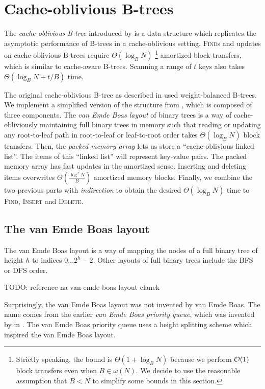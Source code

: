 \chapter{Cache-oblivious B-trees}
\label{chapter:cob}
The \emph{cache-oblivious B-tree} introduced by \cite{cobt}
is a data structure which replicates the asymptotic performance of B-trees
in a cache-oblivious setting.
\textsc{Find}s and updates on cache-oblivious B-trees require $\Theta(\log_B N)$
\footnote{Strictly speaking, the bound is $\Theta(1+\log_B N)$
	because we perform $\mathcal{O}(1)$ block transfers even when $B\in\omega(N)$.
	We decide to use the reasonable assumption that
	$B<N$ to simplify some bounds in this section.}
amortized block transfers, which is similar to cache-aware B-trees.
Scanning a range of $t$ keys also takes $\Theta(\log_B N+t/B)$ time.

The original cache-oblivious B-tree as described in \cite{cobt} used
weight-balanced B-trees. We implement a simplified version of the structure
from \cite{brodal01}, which is composed of three components.
The \emph{van Emde Boas layout} of binary trees is a way of cache-obliviously
maintaining full binary trees in memory such that reading or updating any
root-to-leaf path in root-to-leaf or leaf-to-root order takes $\Theta(\log_B N)$
block transfers.
Then, the \emph{packed memory array} lets us store a ``cache-oblivious linked
list''. The items of this ``linked list'' will represent key-value pairs.
The packed memory array has fast updates in the amortized sense. Inserting
and deleting items overwrites $\Theta(\frac{\log^2 N}{B})$ amortized memory
blocks.
Finally, we combine the two previous parts with \emph{indirection} to obtain
the desired $\Theta(\log_B N)$ time to \textsc{Find}, \textsc{Insert} and
\textsc{Delete}.

\section{The van Emde Boas layout}
The van Emde Boas layout is a way of mapping the nodes of a full binary
tree of height $h$ to indices $0\ldots 2^h-2$. Other layouts of full binary
trees include the BFS or DFS order.

TODO: reference na van emde boas layout clanek

Surprisingly, the van Emde Boas layout was not invented by van Emde Boas.
The name comes from the earlier \emph{van Emde Boas priority queue},
which was invented by \citeauthor{van-emde-boas} in \citeyear{van-emde-boas}.
The van Emde Boas priority queue uses a height splitting scheme which inspired
the van Emde Boas layout.

